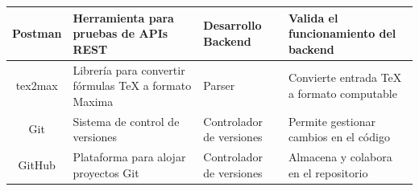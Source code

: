 \begin{longtable}{ | c | m{4.5cm} | m{3.5cm} | m{3.5cm} | }
	Postman & Herramienta para pruebas de APIs REST & Desarrollo Backend & Valida el funcionamiento del backend \\ \hline
	
	tex2max & Librería para convertir fórmulas TeX a formato Maxima & Parser & Convierte entrada TeX a formato computable \\ \hline
	
	Git & Sistema de control de versiones & Controlador de versiones & Permite gestionar cambios en el código \\ \hline
	
	GitHub & Plataforma para alojar proyectos Git & Controlador de versiones & Almacena y colabora en el repositorio \\ \hline
	
\end{longtable}
 \label{tabla:tabla de tecnologías}
\vspace{0.5cm}

%


